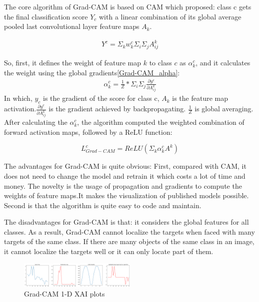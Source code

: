 \documentclass[conference]{IEEEtran}
\begin{document}
The core algorithm of Grad-CAM is based on CAM which proposed: class c gets the final classification score $Y_{c}$ with a linear combination of its global average pooled last convolutional layer feature maps $A_{k}$.

\begin{equation}
    \begin{aligned}
        Y^{c}=\Sigma_{k}w_{k}^{c}\Sigma_{i}\Sigma_{j}A_{ij}^{k}
        \label{Grad-CAM_Y}
    \end{aligned}
  \end{equation}

So, first, it defines the weight of feature map $k$ to class $c$ as $\alpha_{k}^{c}$, and it calculates the weight using the global gradients\ref{Grad-CAM_alpha}:
\begin{equation}
    \begin{aligned}
        \alpha_{k}^{c}=\frac{1}{Z}*\Sigma_{i}\Sigma_{j}\frac{\partial y^{c}}{\partial A_{ij}^{k}}
        \label{Grad-CAM_alpha}
    \end{aligned}
  \end{equation}
  In which, $y_{c}$ is the gradient of the score for class c, $A_{k}$ is the feature map activation.$\frac{\partial y^{c}}{\partial A_{ij}^{k}}$ is the gradient achieved by backpropagating. $\frac{1}{Z}$ is global averaging.
  After calculating the $\alpha_{k}^{c}$, the algorithm computed the weighted combination of forward activation maps, followed by a ReLU function:

$$L_{Grad-CAM}^{c}=ReLU(\Sigma_{k}\alpha_{k}^{c}A^{k})$$

The advantages for Grad-CAM is quite obvious: First, compared with CAM, it does not need to change the model and retrain it which costs a lot of time and money. 
The novelty is the usage of propagation and gradients to compute the weights of feature maps.It makes the visualization of published models possible. Second is that the algorithm is quite easy to code and maintain.\par
The disadvantages for Grad-CAM is that: it considers the global features for all classes. As a result, Grad-CAM cannot localize the targets when faced with many targets of the same class. If there are many objects of the same class in an image, it cannot localize the targets well or it can only locate part of them.

\begin{figure}[h] 
    \centering
    \includegraphics[width=0.5\textwidth]{gd.png}
    \caption{Grad-CAM 1-D XAI plots} 
\end{figure}
\end{document}
